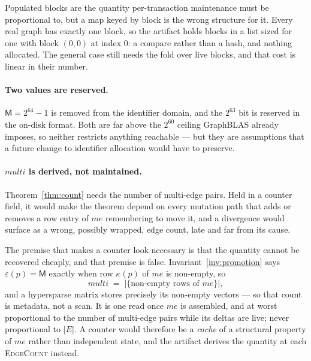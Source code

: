 \documentclass[11pt,a4paper]{article}
\theoremstyle{plain}
\theoremstyle{definition}
\theoremstyle{remark}
\newcommand{\M}{\mathsf{M}}
\begin{document}
Populated blocks are the quantity per-transaction maintenance must be
proportional to, but a map keyed by block is the wrong structure for it. Every
real graph has exactly one block, so the artifact holds blocks in a list sized
for one with block $(0,0)$ at index $0$: a compare rather than a hash, and
nothing allocated. The general case still needs the fold over live blocks, and
that cost is linear in their number.

\paragraph{Two values are reserved.}
$\M = 2^{64}-1$ is removed from the identifier domain, and the $2^{63}$ bit is
reserved in the on-disk format. Both are far above the $2^{60}$ ceiling
GraphBLAS already imposes, so neither restricts anything reachable --- but
they are assumptions that a future change to identifier allocation would have
to preserve.

\paragraph{$\textit{multi}$ is derived, not maintained.}
Theorem~\ref{thm:count} needs the number of multi-edge pairs. Held in a
counter field, it would make the theorem depend on every mutation path that
adds or removes a row entry of $me$ remembering to move it, and a divergence
would surface as a wrong, possibly wrapped, edge count, late and far from its
cause.

The premise that makes a counter look necessary is that the quantity cannot be
recovered cheaply, and that premise is false. Invariant~\ref{inv:promotion} says
$\varepsilon(p) = \M$ exactly when row $\kappa(p)$ of $me$ is non-empty, so
\[
  \textit{multi} \;=\; \bigl|\{\text{non-empty rows of } me\}\bigr| ,
\]
and a hypersparse matrix stores precisely its non-empty vectors --- so that count
is metadata, not a scan. It is one read once $me$ is assembled, and at worst
proportional to the number of multi-edge pairs while its deltas are live; never
proportional to $|E|$. A counter would therefore be a \emph{cache} of a
structural property of $me$ rather than independent state, and the artifact
derives the quantity at each \textsc{EdgeCount} instead.
\end{document}
